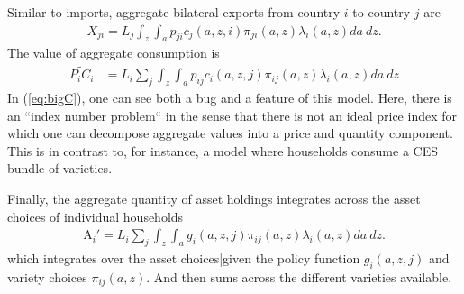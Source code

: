 \documentclass[12pt,pdftex]{article}
\begin{document}
\begin{onehalfspacing}
Similar to imports, aggregate bilateral exports from country $i$ to country $j$ are
\begin{align}
X_{ji} = L_j \int_{z} \int_{a}  p_{ji} c_{j}(a, z, i) \pi_{ji}(a, z) \lambda_i(a, z)da \ dz.
\label{eq:exports}
\end{align}
The value of aggregate consumption is
\begin{align}
\widetilde{P_{i} C_i}  &=  L_{i} \sum_{j} \int_{z} \int_{a}  p_{ij} c_{i}(a, z, j) \pi_{ij}(a, z) \lambda_i(a, z)da \ dz \label{eq:bigC}
\end{align}
In (\ref{eq:bigC}), one can see both a bug and a feature of this model. Here, there is an ``index number problem`` in the sense that there is not an ideal price index for which one can decompose aggregate values into a price and quantity component. This is in contrast to, for instance, a model where households consume a CES bundle of varieties.

Finally, the aggregate quantity of asset holdings integrates across the asset choices of individual households
\begin{align}
\mathrm{A}_i' = L_{i}\sum_{j} \int_{z} \int_{a}  g_{i}(a, z, j) \pi_{ij}(a, z) \lambda_i(a, z) da \ dz.
\label{eq:aggregate_asset}
\end{align}
which integrates over the asset choices|given the policy function $g_{i}(a, z, j)$ and variety choices $\pi_{ij}(a, z)$. And then sums across the different varieties available.


\end{onehalfspacing}
\end{document}
